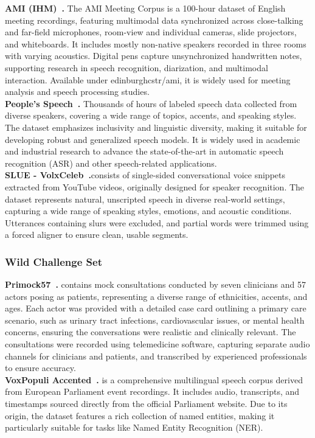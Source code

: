 \noindent\textbf{AMI (IHM)~\cite{ami2005corpus}.} The AMI Meeting Corpus is a 100-hour dataset of English meeting recordings, featuring multimodal data synchronized across close-talking and far-field microphones, room-view and individual cameras, slide projectors, and whiteboards. It includes mostly non-native speakers recorded in three rooms with varying acoustics. Digital pens capture unsynchronized handwritten notes, supporting research in speech recognition, diarization, and multimodal interaction. Available under edinburghcstr/ami, it is widely used for meeting analysis and speech processing studies. \\

\noindent\textbf{People's Speech~\cite{galvez2021peoplesspeechlargescalediverse}.}  Thousands of hours of labeled speech data collected from diverse speakers, covering a wide range of topics, accents, and speaking styles. The dataset emphasizes inclusivity and linguistic diversity, making it suitable for developing robust and generalized speech models. It is widely used in academic and industrial research to advance the state-of-the-art in automatic speech recognition (ASR) and other speech-related applications. \\

\noindent\textbf{SLUE - VolxCeleb~\cite{shon2022slue}.}consists of single-sided conversational voice snippets extracted from YouTube videos, originally designed for speaker recognition. The dataset represents natural, unscripted speech in diverse real-world settings, capturing a wide range of speaking styles, emotions, and acoustic conditions. Utterances containing slurs were excluded, and partial words were trimmed using a forced aligner to ensure clean, usable segments. \\

\subsubsection{Wild Challenge Set}


\noindent\textbf{Primock57~\cite{papadopoulos-korfiatis-etal-2022-primock57}.} 
contains mock consultations conducted by seven clinicians and 57 actors posing as patients, representing a diverse range of ethnicities, accents, and ages. Each actor was provided with a detailed case card outlining a primary care scenario, such as urinary tract infections, cardiovascular issues, or mental health concerns, ensuring the conversations were realistic and clinically relevant. The consultations were recorded using telemedicine software, capturing separate audio channels for clinicians and patients, and transcribed by experienced professionals to ensure accuracy.\\
\noindent\textbf{VoxPopuli Accented~\cite{wang-etal-2021-voxpopuli}.} is a comprehensive multilingual speech corpus derived from European Parliament event recordings. It includes audio, transcripts, and timestamps sourced directly from the official Parliament website. Due to its origin, the dataset features a rich collection of named entities, making it particularly suitable for tasks like Named Entity Recognition (NER). \\

